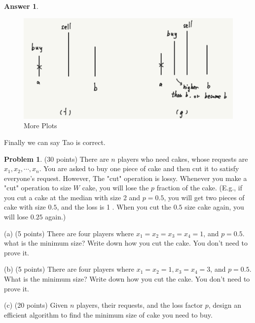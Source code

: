 \documentclass{article}
\theoremstyle{definition}
\newtheorem{prob}{Problem}
\newtheorem{ans}{Answer}
\begin{document}
\begin{ans}
		\begin{figure}
			\centering
			\includegraphics[width=0.55\linewidth]{../Assignment3tex/plot2}
			\caption{More Plots}
			\label{fig:plot2}
		\end{figure}
	
		Finally we can say Tao is correct. 
	\end{ans}
	
	\begin{prob}
	(30 points) There are $n$ players who need cakes, whose requests are $x_{1}, x_{2}, \cdots, x_{n}$. You are asked to buy one piece of cake and then cut it to satisfy everyone's request. However, The "cut" operation is lossy. Whenever you make a "cut" operation to size $W$ cake, you will lose the $p$ fraction of the cake. (E.g., if you cut a cake at the median with size 2 and $p=0.5$, you will get two pieces of cake with size $0.5$, and the loss is 1 . When you cut the $0.5$ size cake again, you will lose $0.25$ again.)
	
	(a) (5 points) There are four players where $x_{1}=x_{2}=x_{3}=x_{4}=1$, and $p=0.5$. what is the minimum size? Write down how you cut the cake. You don't need to prove it.
	
	(b) (5 points) There are four players where $x_{1}=x_{2}=1, x_{3}=x_{4}=3$, and $p=0.5$. What is the minimum size? Write down how you cut the cake. You don't need to prove it.
	
	(c) (20 points) Given $n$ players, their requests, and the loss factor $p$, design an efficient algorithm to find the minimum size of cake you need to buy.

	\end{prob}
\end{document}
